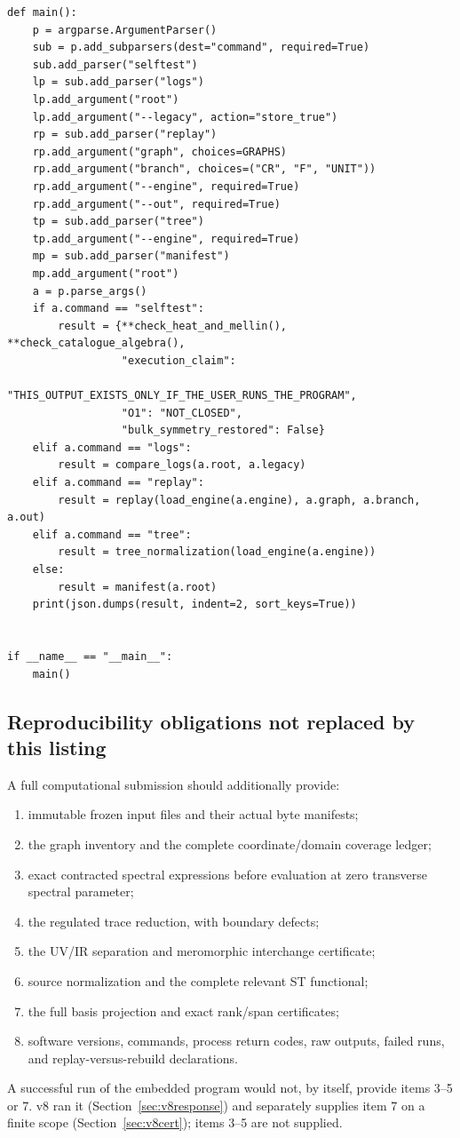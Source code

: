 \documentclass[11pt,a4paper]{article}
\theoremstyle{plain}
\theoremstyle{definition}
\theoremstyle{remark}
\numberwithin{equation}{section}
\begin{document}
\begin{lstlisting}[caption={Consolidated exact checker and coverage-aware optional replay.},
                  label={lst:program}]
def main():
    p = argparse.ArgumentParser()
    sub = p.add_subparsers(dest="command", required=True)
    sub.add_parser("selftest")
    lp = sub.add_parser("logs")
    lp.add_argument("root")
    lp.add_argument("--legacy", action="store_true")
    rp = sub.add_parser("replay")
    rp.add_argument("graph", choices=GRAPHS)
    rp.add_argument("branch", choices=("CR", "F", "UNIT"))
    rp.add_argument("--engine", required=True)
    rp.add_argument("--out", required=True)
    tp = sub.add_parser("tree")
    tp.add_argument("--engine", required=True)
    mp = sub.add_parser("manifest")
    mp.add_argument("root")
    a = p.parse_args()
    if a.command == "selftest":
        result = {**check_heat_and_mellin(), **check_catalogue_algebra(),
                  "execution_claim":
                      "THIS_OUTPUT_EXISTS_ONLY_IF_THE_USER_RUNS_THE_PROGRAM",
                  "O1": "NOT_CLOSED",
                  "bulk_symmetry_restored": False}
    elif a.command == "logs":
        result = compare_logs(a.root, a.legacy)
    elif a.command == "replay":
        result = replay(load_engine(a.engine), a.graph, a.branch, a.out)
    elif a.command == "tree":
        result = tree_normalization(load_engine(a.engine))
    else:
        result = manifest(a.root)
    print(json.dumps(result, indent=2, sort_keys=True))


if __name__ == "__main__":
    main()
\end{lstlisting}

\subsection{Reproducibility obligations not replaced by this listing}

A full computational submission should additionally provide:
\begin{enumerate}[label=\textup{(\arabic*)}]
\item immutable frozen input files and their actual byte manifests;
\item the graph inventory and the complete coordinate/domain
coverage ledger;
\item exact contracted spectral expressions before evaluation at
zero transverse spectral parameter;
\item the regulated trace reduction, with boundary defects;
\item the UV/IR separation and meromorphic interchange certificate;
\item source normalization and the complete relevant ST functional;
\item the full basis projection and exact rank/span certificates;
\item software versions, commands, process return codes, raw
outputs, failed runs, and replay-versus-rebuild declarations.
\end{enumerate}
A successful run of the embedded program would not, by itself,
provide items 3--5 or 7.
v8 ran it (Section~\ref{sec:v8response}) and separately supplies
item 7 on a finite scope (Section~\ref{sec:v8cert}); items 3--5 are
not supplied.
\end{document}
